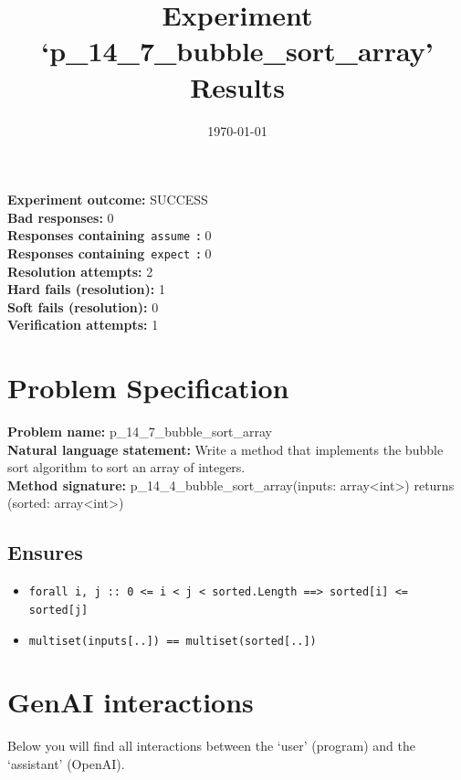 \documentclass{article}
\begin{document}
\title{Experiment `p\_14\_7\_bubble\_sort\_array' Results}
\author{\today}
\date{}
\maketitle
\textbf{Experiment outcome: }SUCCESS
\\\textbf{Bad responses: }0
\\\textbf{Responses containing}~\texttt{assume}~\textbf{: }0
\\\textbf{Responses containing}~\texttt{expect}~\textbf{: }0
\\\textbf{Resolution attempts: }2
\\\textbf{Hard fails (resolution): }1
\\\textbf{Soft fails (resolution): }0
\\\textbf{Verification attempts: }1
\section*{Problem Specification}
\textbf{Problem name: }p\_14\_7\_bubble\_sort\_array
\\\textbf{Natural language statement: }Write a method that implements the bubble sort algorithm to sort an array of integers.
\\\textbf{Method signature: }p\_14\_4\_bubble\_sort\_array(inputs: array<int>) returns (sorted: array<int>)
\subsection*{Ensures}
\begin{itemize}
\item \texttt{forall i, j :: 0 <= i < j < sorted.Length ==> sorted[i] <= sorted[j]}
\item \texttt{multiset(inputs[..]) == multiset(sorted[..])}
\end{itemize}
\clearpage
\section*{GenAI interactions}
Below you will find all interactions between the `user' (program) and the `assistant' (OpenAI).
\end{document}
